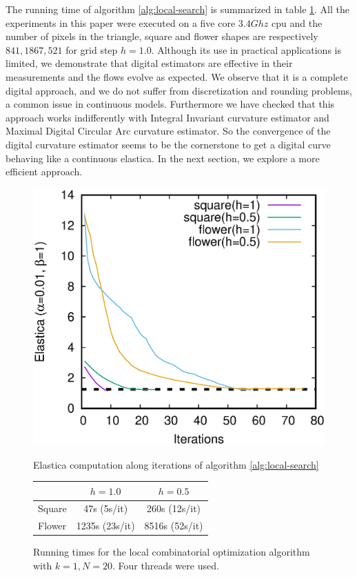 \documentclass[runningheads]{llncs}
\begin{document}
The running time of algorithm \ref{alg:local-search} is summarized in
table \ref{tab:summary-local-comb-rtime}. All the experiments in this paper were executed on a five core $3.4Ghz$ cpu and the number of pixels in the triangle, square and flower shapes are respectively $841,1867,521$ for grid step $h=1.0$. Although its use in practical applications is limited, we
demonstrate that digital estimators are effective in their measurements
and the flows evolve as expected. We observe that it is a
complete digital approach, and we do not suffer from discretization
and rounding problems, a common issue in continuous models.
Furthermore we have checked that this approach works
indifferently with Integral Invariant curvature estimator and
Maximal Digital Circular Arc curvature estimator. So the convergence
of the digital curvature estimator seems to be the cornerstone to
get a digital curve behaving like a continuous elastica.  In the
next section, we explore a more efficient approach.



\begin{figure}
\begin{minipage}[b]{0.5\textwidth}
\center
\includegraphics[scale=0.35]{images/local_search/square-flower.eps}
\caption{Elastica computation along iterations of algorithm \ref{alg:local-search}}
\label{fig:plot-elastica-local-search}
\end{minipage}\hspace{40pt}%
\begin{minipage}[b]{0.45\textwidth}
\center
\captionsetup{type=table}
\begin{tabular}{|l|c|c|}
\hline
& $h=1.0$ & $h=0.5$\\
\hline
Square & 47s (5s/it) & 260s (12s/it)\\
\hline
Flower & 1235s (23s/it)  & 8516s (52s/it)\\
\hline
\end{tabular}
\caption{Running times for the local combinatorial optimization algorithm with $k=1,N=20$. Four threads were used.}
\label{tab:summary-local-comb-rtime}
\end{minipage}
\end{figure}
\end{document}
